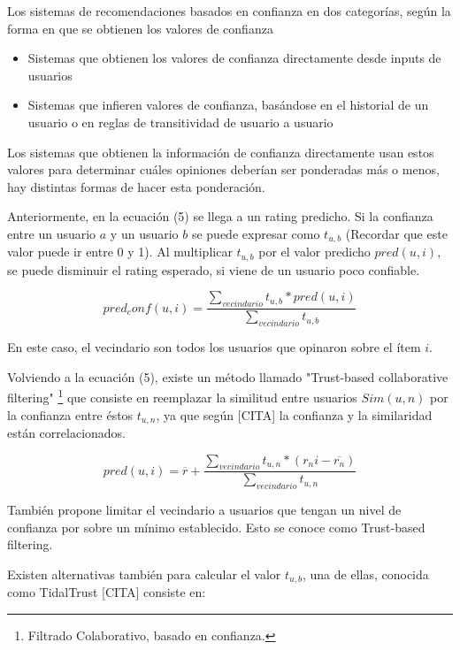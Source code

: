 Los sistemas de recomendaciones basados en confianza en dos categorías, según la forma en que se obtienen los valores de confianza \cite{Victor}

\begin{itemize}
\item{Sistemas que obtienen los valores de confianza directamente desde inputs de usuarios}
\item{Sistemas que infieren valores de confianza, basándose en el historial de un usuario o en reglas de transitividad de usuario a usuario}
\end{itemize}

Los sistemas que obtienen la información de confianza directamente usan estos valores para determinar cuáles opiniones deberían ser ponderadas más o menos, hay distintas formas de hacer esta ponderación.

Anteriormente, en la ecuación (5) se llega a un rating predicho. Si la confianza entre un usuario $a$ y un usuario $b$ se puede expresar como $t_{u,b}$ (Recordar que este valor puede ir entre 0 y 1). Al multiplicar $t_{u,b}$ por el valor predicho $pred(u,i)$, se puede disminuir el rating esperado, si viene de un usuario poco confiable. 

\begin{equation}
pred_conf(u,i) =  \frac{\sum\limits_{vecindario} t_{u,b} *pred(u,i)}{\sum\limits_{vecindario} t_{u,b}}
\end{equation}

En este caso, el vecindario son todos los usuarios que opinaron sobre el ítem $i$.

Volviendo a la ecuación (5), existe un método llamado "Trust-based collaborative filtering" \footnote{Filtrado Colaborativo, basado en confianza.} que consiste en reemplazar la similitud entre usuarios $Sim(u,n)$ por la confianza entre éstos $t_{u,n}$, ya que según [CITA] la confianza y la similaridad están correlacionados. 


\begin{equation}
pred(u,i) = \overline{r} + \frac{\sum\limits_{vecindario} t_{u,n} * (r_ni - \overline{r_n} )}{\sum\limits_{vecindario} t_{u,n}}
\end{equation}

También \cite{Victor} propone limitar el vecindario a usuarios que tengan un nivel de confianza por sobre un mínimo establecido. Esto se conoce como Trust-based filtering.

Existen alternativas también para calcular el valor $t_{u,b}$, una de ellas, conocida como TidalTrust [CITA] consiste en:

